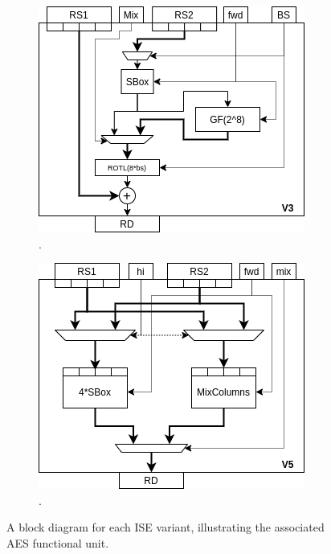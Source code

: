 \begin{figure}[h]
\begin{subfigure}[t]{0.40\textwidth}
    \centering
    \includegraphics[width=\textwidth]{diagrams/ise-datapath-v3.png}
    \caption{.}
    \label{fig:ise:design:v3}
\end{subfigure}
\begin{subfigure}[t]{0.40\textwidth}
    \centering
    \includegraphics[width=\textwidth]{diagrams/ise-datapath-v5.png}
    \caption{.}
    \label{fig:ise:design:v5}
\end{subfigure}
\caption{
A block diagram for each ISE variant, illustrating the associated AES functional unit.
}
\label{fig:ise:design}
\end{figure}

